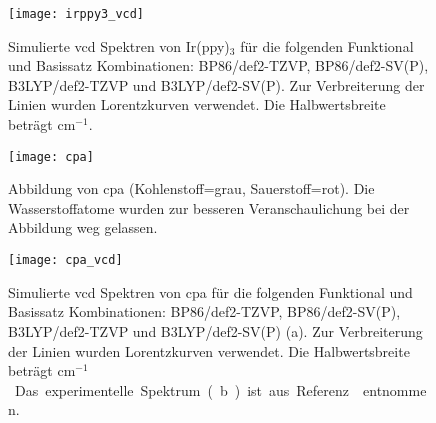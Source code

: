 \begin{figure}[ht!]
	\centering
	\texttt{[image: irppy3\_vcd]}
	\captionsetup{figurewithin = chapter}
	\captionsetup{font=small, labelfont=bf}\caption[Simulierte \ac{vcd} Spektren von Ir(ppy)$_3$]{Simulierte \ac{vcd} Spektren von Ir(ppy)$_3$ für die folgenden Funktional und Basissatz Kombinationen: BP86/def2-TZVP, BP86/def2-SV(P), B3LYP/def2-TZVP und B3LYP/def2-SV(P). Zur Verbreiterung der Linien wurden Lorentzkurven verwendet. Die Halbwertsbreite beträgt \unit[4]{cm$^{-1}$}.}
\label{abb:irppy3_vcd}
\end{figure}

\begin{figure}[ht!]
	\centering
	\texttt{[image: cpa]}
	\captionsetup{figurewithin = chapter}
	\captionsetup{font=small, labelfont=bf}\caption[Abbildung von \ac{cpa}]{Abbildung von \ac{cpa} (Kohlenstoff=grau, Sauerstoff=rot). Die Wasserstoffatome wurden zur besseren Veranschaulichung bei der Abbildung weg gelassen.}
\label{abb:cpa}
\end{figure}

\begin{figure}[ht!]
	\centering
	\texttt{[image: cpa\_vcd]}
	\captionsetup{figurewithin = chapter}
	\captionsetup{font=small, labelfont=bf}\caption[Simulierte \ac{vcd} Spektren von \ac{cpa}]{Simulierte \ac{vcd} Spektren von \ac{cpa} für die folgenden Funktional und Basissatz Kombinationen: BP86/def2-TZVP, BP86/def2-SV(P), B3LYP/def2-TZVP und B3LYP/def2-SV(P) (a). Zur Verbreiterung der Linien wurden Lorentzkurven verwendet. Die Halbwertsbreite beträgt \unit[4]{cm$^{-1}$}. Das experimentelle Spektrum (b) ist aus Referenz \cite{brotin2006vibrational} entnommen.}
\label{abb:cpa_vcd}
\end{figure}


